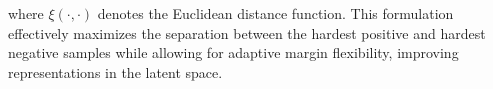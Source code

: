 where $\xi(\cdot, \cdot)$ denotes the Euclidean distance function. This formulation effectively maximizes the separation between the hardest positive and hardest negative samples while allowing for adaptive margin flexibility, improving representations in the latent space.

